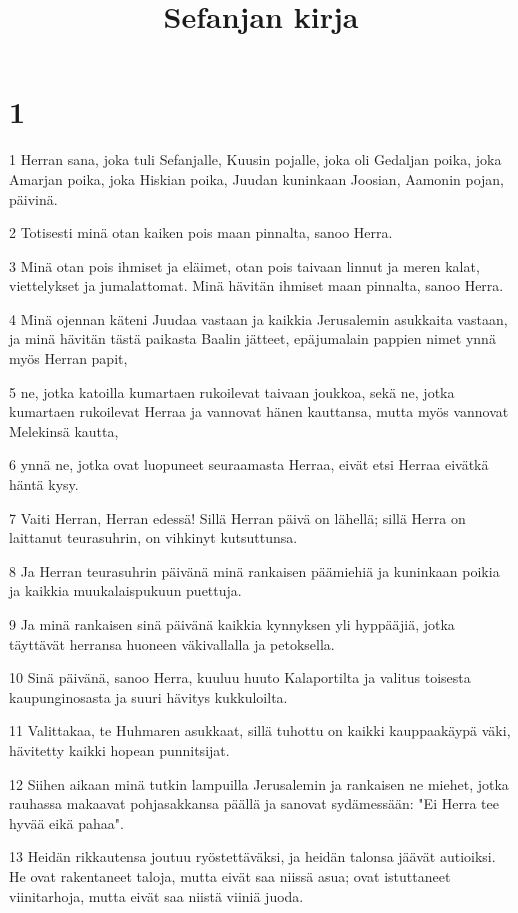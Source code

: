 

\title{Sefanjan kirja}


\chapter{1}

\par 1 Herran sana, joka tuli Sefanjalle, Kuusin pojalle, joka oli Gedaljan poika, joka Amarjan poika, joka Hiskian poika, Juudan kuninkaan Joosian, Aamonin pojan, päivinä.
\par 2 Totisesti minä otan kaiken pois maan pinnalta, sanoo Herra.
\par 3 Minä otan pois ihmiset ja eläimet, otan pois taivaan linnut ja meren kalat, viettelykset ja jumalattomat. Minä hävitän ihmiset maan pinnalta, sanoo Herra.
\par 4 Minä ojennan käteni Juudaa vastaan ja kaikkia Jerusalemin asukkaita vastaan, ja minä hävitän tästä paikasta Baalin jätteet, epäjumalain pappien nimet ynnä myös Herran papit,
\par 5 ne, jotka katoilla kumartaen rukoilevat taivaan joukkoa, sekä ne, jotka kumartaen rukoilevat Herraa ja vannovat hänen kauttansa, mutta myös vannovat Melekinsä kautta,
\par 6 ynnä ne, jotka ovat luopuneet seuraamasta Herraa, eivät etsi Herraa eivätkä häntä kysy.
\par 7 Vaiti Herran, Herran edessä! Sillä Herran päivä on lähellä; sillä Herra on laittanut teurasuhrin, on vihkinyt kutsuttunsa.
\par 8 Ja Herran teurasuhrin päivänä minä rankaisen päämiehiä ja kuninkaan poikia ja kaikkia muukalaispukuun puettuja.
\par 9 Ja minä rankaisen sinä päivänä kaikkia kynnyksen yli hyppääjiä, jotka täyttävät herransa huoneen väkivallalla ja petoksella.
\par 10 Sinä päivänä, sanoo Herra, kuuluu huuto Kalaportilta ja valitus toisesta kaupunginosasta ja suuri hävitys kukkuloilta.
\par 11 Valittakaa, te Huhmaren asukkaat, sillä tuhottu on kaikki kauppaakäypä väki, hävitetty kaikki hopean punnitsijat.
\par 12 Siihen aikaan minä tutkin lampuilla Jerusalemin ja rankaisen ne miehet, jotka rauhassa makaavat pohjasakkansa päällä ja sanovat sydämessään: "Ei Herra tee hyvää eikä pahaa".
\par 13 Heidän rikkautensa joutuu ryöstettäväksi, ja heidän talonsa jäävät autioiksi. He ovat rakentaneet taloja, mutta eivät saa niissä asua; ovat istuttaneet viinitarhoja, mutta eivät saa niistä viiniä juoda.
